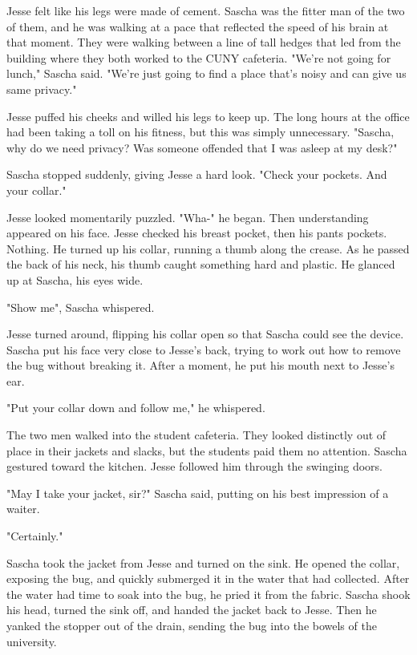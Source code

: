 Jesse felt like his legs were made of cement.  Sascha was the fitter man of the two of them, and he was walking at a pace that reflected the speed of his brain at that moment.  They were walking between a line of tall hedges that led from the building where they both worked to the CUNY cafeteria.  "We're not going for lunch," Sascha said.  "We're just going to find a place that's noisy and can give us same privacy."

Jesse puffed his cheeks and willed his legs to keep up.  The long hours at the office had been taking a toll on his fitness, but this was simply unnecessary.  "Sascha, why do we need privacy?  Was someone offended that I was asleep at my desk?"

Sascha stopped suddenly, giving Jesse a hard look.  "Check your pockets.  And your collar."

Jesse looked momentarily puzzled.  "Wha-" he began.  Then understanding appeared on his face.  Jesse checked his breast pocket, then his pants pockets.  Nothing.  He turned up his collar, running a thumb along the crease.  As he passed the back of his neck, his thumb caught something hard and plastic.  He glanced up at Sascha, his eyes wide.

"Show me", Sascha whispered.

Jesse turned around, flipping his collar open so that Sascha could see the device.  Sascha put his face very close to Jesse's back, trying to work out how to remove the bug without breaking it.  After a moment, he put his mouth next to Jesse's ear.

"Put your collar down and follow me," he whispered.

The two men walked into the student cafeteria.  They looked distinctly out of place in their jackets and slacks, but the students paid them no attention.  Sascha gestured toward the kitchen.  Jesse followed him through the swinging doors.

"May I take your jacket, sir?" Sascha said, putting on his best impression of a waiter.

"Certainly."

Sascha took the jacket from Jesse and turned on the sink.  He opened the collar, exposing the bug, and quickly submerged it in the water that had collected.  After the water had time to soak into the bug, he pried it from the fabric.  Sascha shook his head, turned the sink off, and handed the jacket back to Jesse.  Then he yanked the stopper out of the drain, sending the bug into the bowels of the university.

